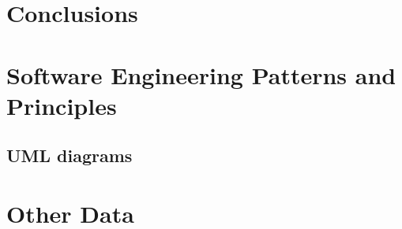 \documentclass{report}
\begin{document}
\chapter{Conclusions}




\begin{appendices}
\chapter{Software Engineering Patterns and Principles}
	\section{UML diagrams}
\chapter{Other Data}
	
\end{appendices}
\end{document}
